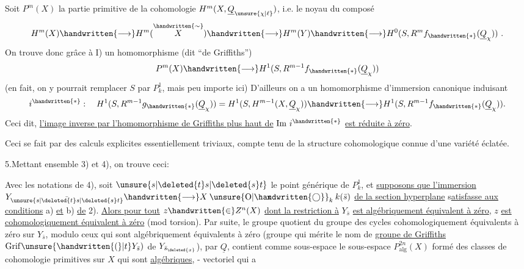 Soit $P^m(X)$ la partie primitive de la cohomologie $H^m(X,\underline{Q}_{\unsure{\chi|\ell}})$, i.e. le noyau du composé
\[
H^m(X)\handwritten{\longrightarrow}H^m(\overset{\handwritten{\sim}}{X})\handwritten{\longrightarrow}H^m(Y)\handwritten{\longrightarrow}H^0(S,R^m f_{\handwritten{*}}(\underline{Q}_{\chi}))\ .
\]
On trouve donc grâce à I) un homomorphisme (dit ``de Griffiths'')
\[
P^m(X)\handwritten{\longrightarrow}H^1(S,R^{m-1}f_{\handwritten{*}}(\underline{Q}_{\chi}))
\]
(en fait, on y pourrait remplacer $S$ par $P^1_k$, mais  peu importe ici)
D'ailleurs  on a un homomorphisme d'immersion canonique
induisant
\[
i^{\handwritten{*}}:\quad H^1(S,R^{m-1}g_{\handwritten{*}}(\underline{Q}_{\chi}))=H^1(S,H^{m-1}(X,\underline{Q}_{\chi}))\handwritten{\longrightarrow}H^1(S,R^{m-1}f_{\handwritten{*}}(\underline{Q}_{\chi})).
\]
Ceci dit, \uline{l'image inverse par l'homomorphisme de Griffiths plus haut de} $\mathrm{Im}\ i^{\handwritten{*}}$ \uline{est réduite à zéro}.

Ceci se fait par des calculs explicites essentiellement triviaux, compte tenu de la structure cohomologique connue d'une variété éclatée.

5.\quad Mettant ensemble 3) et 4), on trouve ceci:

 Avec les notations de 4),  soit $\unsure{s|\deleted{t}s|\deleted{s}t}$ le point générique de $P^1_k$, et \uline{supposons que l'immersion} $Y_{\bar{\unsure{s|\deleted{t}s|\deleted{s}t}}}\handwritten{\longrightarrow}X\mathbin{\ooalign{\hfil$\mathrm{x}$\hfil\cr\hfil$\unsure{\mathrm{O}|\handwritten{\bigcirc}}$\hfil\cr}}_k k(\bar s)$ \uline{de la section hyperplane}   s\uline{atisfasse aux conditions} a) \uline{et} b) \uline{de} 2). \uline{Alors pour tout} $z\handwritten{\in}Z^n(X)$ \uline{dont la restriction à} $Y_{\bar s}$ \uline{est algébriquement équivalent à zéro}, $z$ \uline{est cohomologiquement équivalent à zéro} (mod torsion).  Par suite, le groupe quotient du groupe des cycles cohomologiquement équivalents à zéro  sur $Y_{\bar s}$, modulo ceux qui sont algébriquement équivalents à zéro (groupe qui mérite le nom de \uline{groupe de Griffiths} $\mathrm{Grif}\unsure{\handwritten{(}|t}Y_{\bar s})$ de $Y_{\bar s_{\deleted{x}}}$),  par $\underline{Q}$, contient comme sous-espace le sous-espace $P^{2n}_{\mathrm{alg}}(X)$ formé des classes de cohomologie primitives sur $X$ qui sont \uline{algébriques}, - vectoriel qui a
